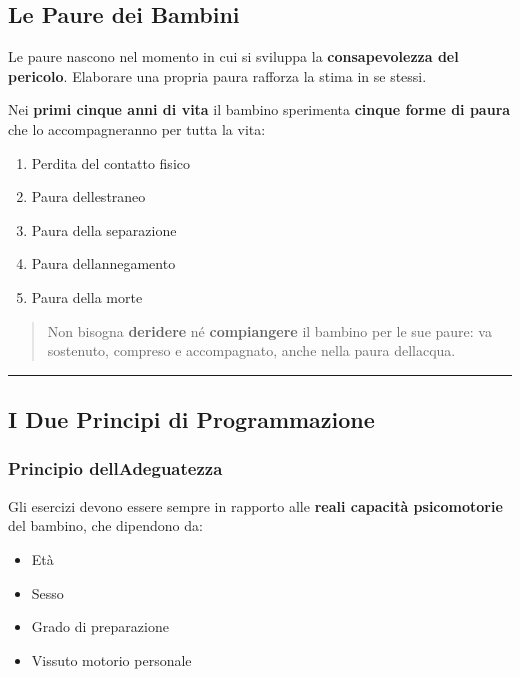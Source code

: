 \documentclass[a4paper,11pt]{article}
\providecommand{\tightlist}{%
  \setlength{\itemsep}{0pt}\setlength{\parskip}{0pt}}
\begin{document}
\subsection{Le Paure dei Bambini}\label{le-paure-dei-bambini}

Le paure nascono nel momento in cui si sviluppa la
\textbf{consapevolezza del pericolo}. Elaborare una propria paura
rafforza la stima in se stessi.

Nei \textbf{primi cinque anni di vita} il bambino sperimenta
\textbf{cinque forme di paura} che lo accompagneranno per tutta la vita:

\begin{enumerate}
      \tightlist
      \item
            Perdita del contatto fisico
      \item
            Paura dell\textquotesingle estraneo
      \item
            Paura della separazione
      \item
            Paura dell\textquotesingle annegamento
      \item
            Paura della morte
\end{enumerate}

\begin{quote}
      Non bisogna \textbf{deridere} né \textbf{compiangere} il bambino per le
      sue paure: va sostenuto, compreso e accompagnato, anche nella paura
      dell\textquotesingle acqua.
\end{quote}

\begin{center}\rule{0.5\linewidth}{0.5pt}\end{center}

\subsection{I Due Principi di
      Programmazione}\label{i-due-principi-di-programmazione}

\subsubsection{Principio
      dell\textquotesingle Adeguatezza}\label{principio-delladeguatezza}

Gli esercizi devono essere sempre in rapporto alle \textbf{reali
      capacità psicomotorie} del bambino, che dipendono da:

\begin{itemize}
      \tightlist
      \item
            Età
      \item
            Sesso
      \item
            Grado di preparazione
      \item
            Vissuto motorio personale
\end{itemize}
\end{document}
